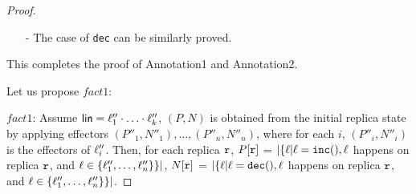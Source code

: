 \begin {proof}
\begin{itemize}
    By the causal delivery assumption, for each operation $\alabel''$, such that $\alabel''$ is visible to $\alabel$, we can see that, the effector of $\alabel''$ has already been applied in $S'$, and it is easy to see that the effector of $\alabel''$ has already been applied in $S$. By Annotation1 of the effector $(P_{\alabel},N_{\alabel})$ and Annotation2 of $S$, we can see that, for each replica $\arep' \neq \arep_{\alabel}$, we have $P_{\alabel}[\arep'] \leq P[\arep']$ and $N_{\alabel}[\arep'] \leq N[\arep']$.

    By the causal delivery assumption, for each operation $\alabel'$, such that $\alabel$ is visible to $\alabel'$, we can see that, the effector of $\alabel'$ has not been applied in $S'$ yet, and it is easy to see that the effector of $\alabel'$ has not been applied in $S$ yet. Especially, this holds for operations happen on replica $\arep_{\alabel}$. Also, note that, the effector of $\alabel$ has not been applied in $S$ yet. By Annotation1 of the effector $(P_{\alabel},N_{\alabel})$ and Annotation2 of $S$, we can see that, $P_{\alabel}[\arep_{\alabel}] = P[\arep_{\alabel}]+1$, $N_{\alabel}[\arep_{\alabel}] = N[\arep_{\alabel}]$.

    Therefore, we can see that $P' = P[\arep_{\alabel}: P[\arep_{\alabel}]+1]$ and $N' = N$. Thus, Annotation2 for replica state $S'$ holds.

\item[-] The case of {\tt dec} can be similarly proved.
\end{itemize}

This completes the proof of Annotation1 and Annotation2.



Let us propose $fact1$:

$fact1$: Assume $\alinord = \alabel''_1 \cdot \ldots \cdot \alabel''_k$, $(P,N)$ is obtained from the initial replica state by applying effectors $(P''_1,N''_1),\ldots,(P''_n,N''_n)$, where for each $i$, $(P''_i,N''_i)$ is the effectors of $\alabel''_i$. Then, for each replica $\arep$, $P[\arep]$ =  $\vert \{ \alabel \vert \alabel = \alabelshort[{\tt inc}]{}, \alabel$ happens on replica $\arep$, and $\alabel \in \{ \alabel''_1,\ldots,\alabel''_n \} \} \vert$, $N[\arep]$ =  $\vert \{ \alabel \vert \alabel = \alabelshort[{\tt dec}]{}, \alabel$ happens on replica $\arep$, and $\alabel \in \{ \alabel''_1,\ldots,\alabel''_n \} \} \vert$.




\end{proof}
